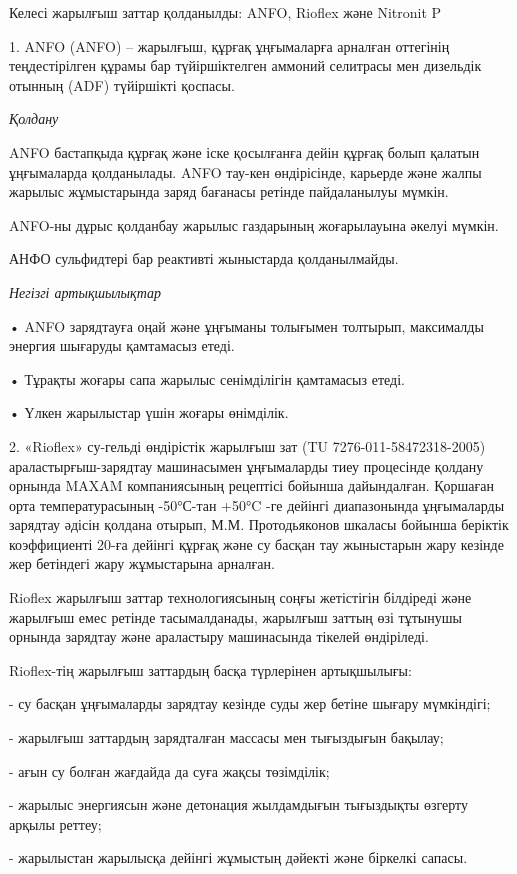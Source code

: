 \begin{multicols}{2}
Келесі жарылғыш заттар қолданылды: ANFO, Rioflex және Nitronit P

1. ANFO (ANFO) -- жарылғыш, құрғақ ұңғымаларға арналған оттегінің
теңдестірілген құрамы бар түйіршіктелген аммоний селитрасы мен дизельдік
отынның (ADF) түйіршікті қоспасы.

\emph{Қолдану}

ANFO бастапқыда құрғақ және іске қосылғанға дейін құрғақ болып қалатын
ұңғымаларда қолданылады. ANFO тау-кен өндірісінде, карьерде және жалпы
жарылыс жұмыстарында заряд бағанасы ретінде пайдаланылуы мүмкін.

ANFO-ны дұрыс қолданбау жарылыс газдарының жоғарылауына әкелуі мүмкін.

АНФО сульфидтері бар реактивті жыныстарда қолданылмайды.

\emph{Негізгі артықшылықтар}

• ANFO зарядтауға оңай және ұңғыманы толығымен толтырып, максималды
энергия шығаруды қамтамасыз етеді.

• Тұрақты жоғары сапа жарылыс сенімділігін қамтамасыз етеді.

• Үлкен жарылыстар үшін жоғары өнімділік.

2. «Rioflex» су-гельді өндірістік жарылғыш зат (TU
7276-011-58472318-2005) араластырғыш-зарядтау машинасымен ұңғымаларды
тиеу процесінде қолдану орнында MAXAM компаниясының рецептісі бойынша
дайындалған. Қоршаған орта температурасының -50°С-тан +50°C -ге дейінгі
диапазонында ұңғымаларды зарядтау әдісін қолдана отырып, М.М.
Протодьяконов шкаласы бойынша беріктік коэффициенті 20-ға дейінгі құрғақ
және су басқан тау жыныстарын жару кезінде жер бетіндегі жару
жұмыстарына арналған.

Rioflex жарылғыш заттар технологиясының соңғы жетістігін білдіреді және
жарылғыш емес ретінде тасымалданады, жарылғыш заттың өзі тұтынушы
орнында зарядтау және араластыру машинасында тікелей өндіріледі.

Rioflex-тің жарылғыш заттардың басқа түрлерінен артықшылығы:

- су басқан ұңғымаларды зарядтау кезінде суды жер бетіне шығару
мүмкіндігі;

- жарылғыш заттардың зарядталған массасы мен тығыздығын бақылау;

- ағын су болған жағдайда да суға жақсы төзімділік;

- жарылыс энергиясын және детонация жылдамдығын тығыздықты өзгерту
арқылы реттеу;

- жарылыстан жарылысқа дейінгі жұмыстың дәйекті және біркелкі сапасы.


\end{multicols}
